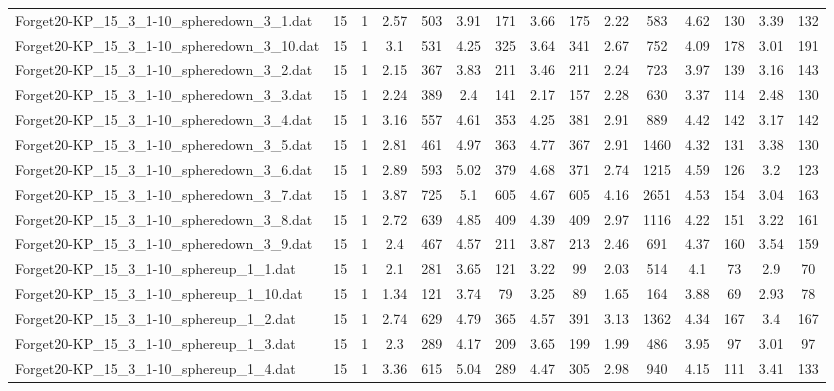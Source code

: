 \begin{table}[!ht]
{\begin{tabular}{lcccccccccccccc}
Forget20-KP\_15\_3\_1-10\_spheredown\_3\_1.dat & 15 & 1 & 2.57 & 503 & 3.91 & 171 & 3.66 & 175 & 2.22 & 583 & 4.62 & 130 & 3.39 & 132 \\
Forget20-KP\_15\_3\_1-10\_spheredown\_3\_10.dat & 15 & 1 & 3.1 & 531 & 4.25 & 325 & 3.64 & 341 & 2.67 & 752 & 4.09 & 178 & 3.01 & 191 \\
Forget20-KP\_15\_3\_1-10\_spheredown\_3\_2.dat & 15 & 1 & 2.15 & 367 & 3.83 & 211 & 3.46 & 211 & 2.24 & 723 & 3.97 & 139 & 3.16 & 143 \\
Forget20-KP\_15\_3\_1-10\_spheredown\_3\_3.dat & 15 & 1 & 2.24 & 389 & 2.4 & 141 & 2.17 & 157 & 2.28 & 630 & 3.37 & 114 & 2.48 & 130 \\
Forget20-KP\_15\_3\_1-10\_spheredown\_3\_4.dat & 15 & 1 & 3.16 & 557 & 4.61 & 353 & 4.25 & 381 & 2.91 & 889 & 4.42 & 142 & 3.17 & 142 \\
Forget20-KP\_15\_3\_1-10\_spheredown\_3\_5.dat & 15 & 1 & 2.81 & 461 & 4.97 & 363 & 4.77 & 367 & 2.91 & 1460 & 4.32 & 131 & 3.38 & 130 \\
Forget20-KP\_15\_3\_1-10\_spheredown\_3\_6.dat & 15 & 1 & 2.89 & 593 & 5.02 & 379 & 4.68 & 371 & 2.74 & 1215 & 4.59 & 126 & 3.2 & 123 \\
Forget20-KP\_15\_3\_1-10\_spheredown\_3\_7.dat & 15 & 1 & 3.87 & 725 & 5.1 & 605 & 4.67 & 605 & 4.16 & 2651 & 4.53 & 154 & 3.04 & 163 \\
Forget20-KP\_15\_3\_1-10\_spheredown\_3\_8.dat & 15 & 1 & 2.72 & 639 & 4.85 & 409 & 4.39 & 409 & 2.97 & 1116 & 4.22 & 151 & 3.22 & 161 \\
Forget20-KP\_15\_3\_1-10\_spheredown\_3\_9.dat & 15 & 1 & 2.4 & 467 & 4.57 & 211 & 3.87 & 213 & 2.46 & 691 & 4.37 & 160 & 3.54 & 159 \\
Forget20-KP\_15\_3\_1-10\_sphereup\_1\_1.dat & 15 & 1 & 2.1 & 281 & 3.65 & 121 & 3.22 & 99 & 2.03 & 514 & 4.1 & 73 & 2.9 & 70 \\
Forget20-KP\_15\_3\_1-10\_sphereup\_1\_10.dat & 15 & 1 & 1.34 & 121 & 3.74 & 79 & 3.25 & 89 & 1.65 & 164 & 3.88 & 69 & 2.93 & 78 \\
Forget20-KP\_15\_3\_1-10\_sphereup\_1\_2.dat & 15 & 1 & 2.74 & 629 & 4.79 & 365 & 4.57 & 391 & 3.13 & 1362 & 4.34 & 167 & 3.4 & 167 \\
Forget20-KP\_15\_3\_1-10\_sphereup\_1\_3.dat & 15 & 1 & 2.3 & 289 & 4.17 & 209 & 3.65 & 199 & 1.99 & 486 & 3.95 & 97 & 3.01 & 97 \\
Forget20-KP\_15\_3\_1-10\_sphereup\_1\_4.dat & 15 & 1 & 3.36 & 615 & 5.04 & 289 & 4.47 & 305 & 2.98 & 940 & 4.15 & 111 & 3.41 & 133 \\

\end{tabular}}
\end{table}
